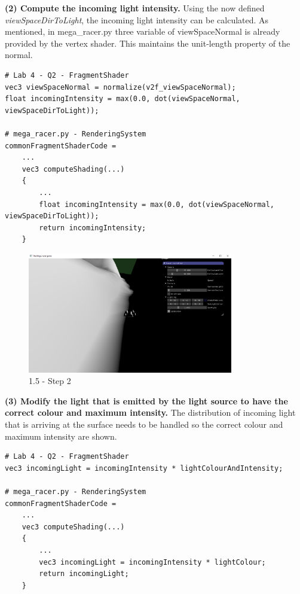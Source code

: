 \documentclass[a4 paper, 12pt]{article}
\begin{document}
\textbf{(2) Compute the incoming light intensity.}
Using the now defined \textit{viewSpaceDirToLight}, the incoming light intensity can be calculated. As mentioned, in mega\_racer.py three variable of viewSpaceNormal is already provided by the vertex shader. This maintains the unit-length property of the normal.
    \begin{lstlisting}
# Lab 4 - Q2 - FragmentShader
vec3 viewSpaceNormal = normalize(v2f_viewSpaceNormal);
float incomingIntensity = max(0.0, dot(viewSpaceNormal, viewSpaceDirToLight));

# mega_racer.py - RenderingSystem
commonFragmentShaderCode =
    ...
    vec3 computeShading(...)
    {
        ...
        float incomingIntensity = max(0.0, dot(viewSpaceNormal, viewSpaceDirToLight));
        return incomingIntensity;
    }
    \end{lstlisting}

    \begin{figure} [H]
        \centering
        \includegraphics[width=0.8\textwidth, frame]
            {./images/mega_racer/1.5_b.PNG}
        \caption{1.5 - Step 2}
    \end{figure}


\textbf{(3) Modify the light that is emitted by the light source to have the correct colour and maximum intensity.}
The distribution of incoming light that is arriving at the surface needs to be handled so the correct colour and maximum intensity are shown.
    \begin{lstlisting}
# Lab 4 - Q2 - FragmentShader
vec3 incomingLight = incomingIntensity * lightColourAndIntensity;

# mega_racer.py - RenderingSystem
commonFragmentShaderCode =
    ...
    vec3 computeShading(...)
    {
        ...
        vec3 incomingLight = incomingIntensity * lightColour;
        return incomingLight;
    }        
    \end{lstlisting}
\end{document}
